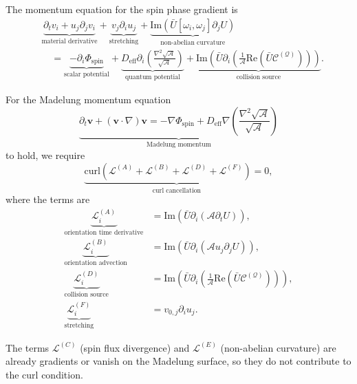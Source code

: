 \documentclass[11pt]{article}
\numberwithin{equation}{section}
\providecommand{\cQ}{\mathcal{Q}}
\providecommand{\cA}{\mathcal{A}}
\begin{document}
The momentum equation for the spin phase gradient is
\begin{equation}
	\begin{aligned}
		&\underbrace{\partial_t v_i + u_j \partial_j v_i}_{\text{material derivative}}
		+ \underbrace{v_j \partial_i u_j}_{\text{stretching}}
		+ \underbrace{\mathrm{Im}(\bar{U} [\omega_i, \omega_j] \partial_j U)}
		_{\text{non-abelian curvature}} \\
		&\quad = \underbrace{-\partial_i \Phi_{\mathrm{spin}}}_{\text{scalar potential}}
		+ \underbrace{D_{\mathrm{eff}} \partial_i \left(
			\frac{\nabla^2 \sqrt{\cA}}{\sqrt{\cA}} \right)}_{\text{quantum potential}}
		+ \underbrace{\mathrm{Im}\left( \bar{U} \partial_i \left(
			\frac{1}{\cA} \mathrm{Re}(\bar{U} \mathcal{C}^{(\cQ)}) \right)
			\right)}_{\text{collision source}}.
	\end{aligned}
	\label{eq:closure-2-exact}
\end{equation}

For the Madelung momentum equation
\begin{equation}
	\underbrace{\partial_t \mathbf{v} + (\mathbf{v} \cdot \nabla) \mathbf{v}
		= -\nabla \Phi_{\mathrm{spin}} + D_{\mathrm{eff}} \nabla \left(
		\frac{\nabla^2 \sqrt{\cA}}{\sqrt{\cA}} \right)}_{\text{Madelung momentum}}
	\label{eq:madelung-momentum}
\end{equation}
to hold, we require
\begin{equation}
	\boxed{
		\underbrace{\mathrm{curl}\left( \mathcal{L}^{(A)} + \mathcal{L}^{(B)}
			+ \mathcal{L}^{(D)} + \mathcal{L}^{(F)} \right) = 0}_{\text{curl cancellation}},
	}
	\label{eq:closure-2}
\end{equation}
where the terms are
\begin{align}
	\underbrace{\mathcal{L}_i^{(A)}}_{\text{orientation time derivative}}
	&= \mathrm{Im}(\bar{U} \partial_i (\cA \partial_t U)), \\
	\underbrace{\mathcal{L}_i^{(B)}}_{\text{orientation advection}}
	&= \mathrm{Im}(\bar{U} \partial_i (\cA u_j \partial_j U)), \\
	\underbrace{\mathcal{L}_i^{(D)}}_{\text{collision source}}
	&= \mathrm{Im}\left( \bar{U} \partial_i \left( \frac{1}{\cA}
	\mathrm{Re}(\bar{U} \mathcal{C}^{(\cQ)}) \right) \right), \\
	\underbrace{\mathcal{L}_i^{(F)}}_{\text{stretching}}
	&= v_{0,j} \partial_i u_j.
	\label{eq:closure-2-terms}
\end{align}

The terms $\mathcal{L}^{(C)}$ (spin flux divergence) and
$\mathcal{L}^{(E)}$ (non-abelian curvature) are already gradients or
vanish on the Madelung surface, so they do not contribute to the curl
condition.
\end{document}

